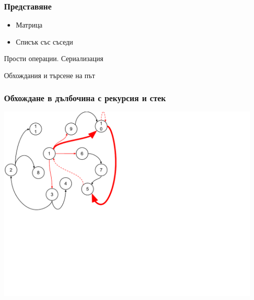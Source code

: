 \documentclass{beamer}
\begin{document}
\begin{frame}[fragile]
\frametitle{Представяне}

\begin{itemize}
  \item Матрица
  \item Списък със съседи 
\end{itemize}

\end{frame}


\begin{frame}
\centerline{Прости операции. Сериализация}
\end{frame}

\begin{frame}
\centerline{Обхождания и търсене на път}
\end{frame}

\begin{frame}[fragile]
\frametitle{Обхождане в дълбочина с рекурсия и стек}
 

 \includegraphics[width=13cm]{images/graph_dfs}


\end{frame}
\end{document}
